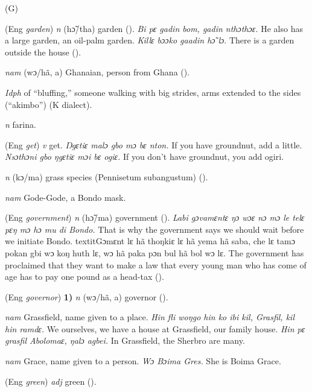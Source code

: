 \begin{letter}{(G)}

 (Eng \textit{garden}) \textit{n} (hɔ̃/tha) garden (\citealt{Pichl1967}). \textit{Bi pɛ gadin bom, gadin nthɔthɔɛ.} He also has a large garden, an oil-palm garden. \textit{Killɛ bɔɔko gaadin hɔ̃ lɔ}. There is a garden outside the house (\citealt{Pichl1967}). 

 \textit{nam} (wɔ/hã, a) Ghanaian, person from Ghana (\citealt{Pichl1967}). 

 \textit{Idph} of “bluffing,” someone walking with big strides, arms extended to the sides (“akimbo”) (K dialect). 

 \textit{n} farina.

 (Eng \textit{get}) \textit{v} get. \textit{Ŋgɛtiɛ malɔ gbo mɔ bɛ nton.} If you have groundnut, add a little. \textit{Nsɔthɔni gbo ŋgɛtiɛ mɔi bɛ ogiɛ.} If you don't have groundnut, you add ogiri.

 \textit{n} (kɔ/ma) grass species (Pennisetum subangustum) (\citealt{Pichl1967}). 

 \textit{nam} Gode-Gode, a Bondo mask. 

 (Eng \textit{government}) \textit{n} (hɔ̃/ma) government (\citealt{Pichl1967}). \textit{Labi gɔvamɛntɛ ŋɔ wɔɛ nɔ mɔ le telɛ pɛŋ mɔ hɔ mu di Bondo.} That is why the government says we should wait before we initiate Bondo. textit{Gɔmɛnt lɛ hã thoŋkiɛ lɛ hã yema hã saba, che lɛ tamɔ pokan gbi wɔ koŋ huth lɛ, wɔ hã paka pɔn bul hã bol wɔ lɛ.} The government has proclaimed that they want to make a law that every young man who has come of age has to pay one pound as a head-tax (\citealt{Pichl1967}).

 (Eng \textit{governor}) \textbf{1)} \textit{n} (wɔ/hã, a) governor (\citealt{Pichl1967}). 

 \textit{nam} Grassfield, name given to a place. \textit{Hin fli woŋgo hin ko ibi kil, Grasfil, kil hin ramdɛ.} We ourselves, we have a house at Grassfield, our family house. \textit{Hin pɛ grasfil Abolomaɛ, ŋalɔ agbei.} In Grassfield, the Sherbro are many.

 \textit{nam} Grace, name given to a person. \textit{Wɔ Bɔima Gres.} She is Boima Grace.

 (Eng \textit{green}) \textit{adj} green (\citealt{Pichl1967}). 


\end{letter}
